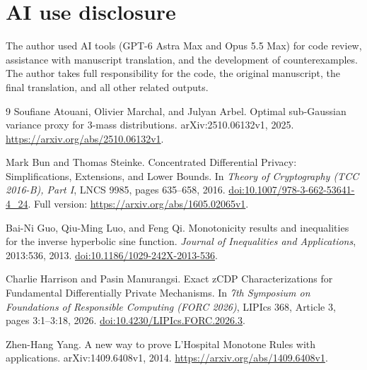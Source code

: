\documentclass[11pt]{article}
\begin{document}
\section*{AI use disclosure}

The author used AI tools (GPT-6 Astra Max and Opus 5.5 Max) for code review,
assistance with manuscript translation, and the development of counterexamples.
The author takes full responsibility for the code, the original manuscript,
the final translation, and all other related outputs.

\begin{thebibliography}{9}
Soufiane Atouani, Olivier Marchal, and Julyan Arbel.
\newblock Optimal sub-Gaussian variance proxy for 3-mass distributions.
\newblock arXiv:2510.06132v1, 2025.
\newblock \url{https://arxiv.org/abs/2510.06132v1}.

Mark Bun and Thomas Steinke.
\newblock Concentrated Differential Privacy: Simplifications, Extensions,
and Lower Bounds.
\newblock In \emph{Theory of Cryptography (TCC 2016-B), Part I},
LNCS 9985, pages 635--658, 2016.
\newblock \href{https://doi.org/10.1007/978-3-662-53641-4_24}
{doi:10.1007/978-3-662-53641-4\_24}.
\newblock Full version: \url{https://arxiv.org/abs/1605.02065v1}.

Bai-Ni Guo, Qiu-Ming Luo, and Feng Qi.
\newblock Monotonicity results and inequalities for the inverse hyperbolic
sine function.
\newblock \emph{Journal of Inequalities and Applications}, 2013:536, 2013.
\newblock \href{https://doi.org/10.1186/1029-242X-2013-536}
{doi:10.1186/1029-242X-2013-536}.

Charlie Harrison and Pasin Manurangsi.
\newblock Exact zCDP Characterizations for Fundamental Differentially
Private Mechanisms.
\newblock In \emph{7th Symposium on Foundations of Responsible Computing
(FORC 2026)}, LIPIcs 368, Article 3, pages 3:1--3:18, 2026.
\newblock \href{https://doi.org/10.4230/LIPIcs.FORC.2026.3}
{doi:10.4230/LIPIcs.FORC.2026.3}.

Zhen-Hang Yang.
\newblock A new way to prove L'Hospital Monotone Rules with applications.
\newblock arXiv:1409.6408v1, 2014.
\newblock \url{https://arxiv.org/abs/1409.6408v1}.
\end{thebibliography}
\end{document}
